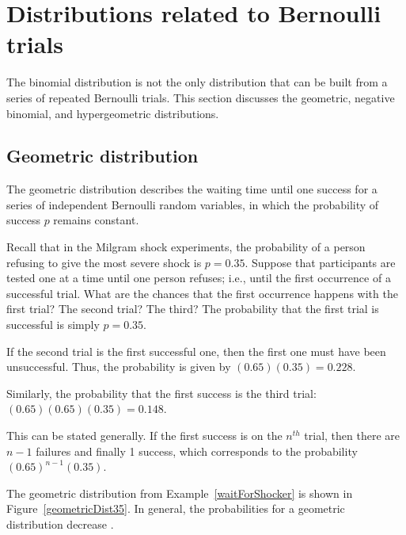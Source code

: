 

\section{Distributions related to Bernoulli trials}
\label{distRelatedToBernoulli}

The binomial distribution is not the only distribution that can be built from a series of repeated Bernoulli trials. This section discusses the geometric, negative binomial, and hypergeometric distributions.

\subsection{Geometric distribution}
\label{geomDist}


The geometric distribution describes the waiting time until one success for a series of independent Bernoulli random variables, in which the probability of success $p$ remains constant.

\begin{examplewrap}
\begin{nexample}{Recall that in the Milgram shock experiments, the probability of a person refusing to give the most severe shock is $p = 0.35$. Suppose that participants are tested one at a time until one person refuses; i.e., until the first occurrence of a successful trial. What are the chances that the first occurrence happens with the first trial? The second trial? The third?}\label{waitForShocker}%
The probability that the first trial is successful is simply $p = 0.35$. 

If the second trial is the first successful one, then the first one must have been unsuccessful. Thus, the probability is given by $(0.65)(0.35) = 0.228$.

Similarly, the probability that the first success is the third trial: $(0.65)(0.65)(0.35) = 0.148$.

This can be stated generally. If the first success is on the $n^{th}$ trial, then there are $n-1$ failures and finally 1 success, which corresponds to the probability $(0.65)^{n-1}(0.35)$.
\end{nexample}
\end{examplewrap}

The geometric distribution from Example~\ref{waitForShocker} is shown in Figure~\ref{geometricDist35}. In general, the probabilities for a geometric distribution decrease .

